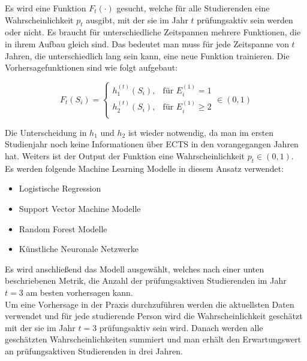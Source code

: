 Es wird eine Funktion $F_t(\cdot)$ gesucht, welche f\"ur alle Studierenden eine Wahrscheinlichkeit $p_t$ ausgibt, mit der
sie im Jahr $t$ pr\"ufungsaktiv sein werden oder nicht. Es braucht f\"ur unterschiedliche Zeitspannen mehrere Funktionen, die in ihrem Aufbau gleich sind.
Das bedeutet man muss f\"ur jede Zeitspanne von $t$ Jahren, die unterschiedlich lang sein kann, eine neue Funktion trainieren.
Die Vorhersagefunktionen sind wie folgt aufgebaut:

$$
  F_t(S_i)=
  \left\{
  \begin{array}{lr}
    h_1^{(t)}(S_i), & \text{für }E_i^{(1)} = 1    \\
    h_2^{(t)}(S_i), & \text{für }E_i^{(1)} \geq 2 \\
  \end{array}
  \right.
  \in (0,1)
$$

Die Unterscheidung in $h_1$ und $h_2$ ist wieder notwendig, da man im ersten Studienjahr noch keine Informationen \"uber ECTS in den vorangegangen Jahren hat.
Weiters ist der Output der Funktion eine Wahrscheinlichkeit $p_t \in (0,1)$. \\

Es werden folgende Machine Learning Modelle in diesem Ansatz verwendet:
\begin{itemize}
  \item Logistische Regression
  \item Support Vector Machine Modelle
  \item Random Forest Modelle
  \item K\"unstliche Neuronale Netzwerke
\end{itemize}

Es wird anschlie{\ss}end das Modell ausgew\"ahlt, welches nach einer unten beschriebenen Metrik, die Anzahl der pr\"ufungsaktiven Studierenden
im Jahr $t = 3$ am besten vorhersagen kann. \\

Um eine Vorhersage in der Praxis durchzuf\"uhren werden die aktuellsten Daten verwendet und f\"ur jede studierende Person wird die
Wahrscheinlichkeit gesch\"atzt mit der sie im Jahr $t=3$ pr\"ufungsaktiv sein wird. Danach werden alle gesch\"atzten Wahrscheinlichkeiten summiert und
man erh\"alt den Erwartungswert an pr\"ufungsaktiven Studierenden in drei Jahren.




